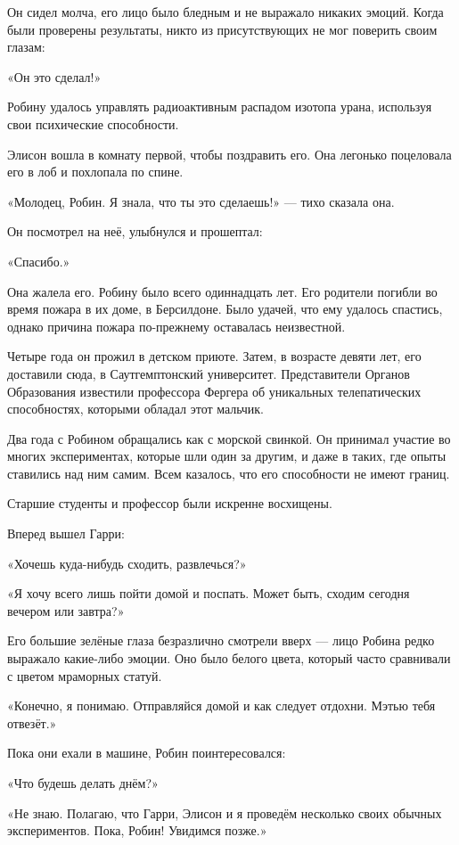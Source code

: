 \documentclass[a5paper, 9pt,
final, openany, twoside=true]{memoir}
\begin{document}
Он сидел молча, его лицо было бледным и не выражало никаких эмоций. Когда были проверены результаты, никто из присутствующих не мог поверить своим глазам:\bigskip

«Он это сделал!»\bigskip

Робину удалось управлять радиоактивным распадом изотопа урана, используя свои психические способности.

Элисон вошла в комнату первой, чтобы поздравить его. Она легонько поцеловала его в лоб и похлопала по спине.

«Молодец, Робин. Я знала, что ты это сделаешь!» — тихо сказала она.\bigskip

Он посмотрел на неё, улыбнулся и прошептал:

«Спасибо.»

Она жалела его. Робину было всего одиннадцать лет. Его родители погибли во время пожара в их доме, в Берсилдоне. Было удачей, что ему удалось спастись, однако причина пожара по-прежнему оставалась неизвестной.

Четыре года он прожил в детском приюте. Затем, в возрасте девяти лет, его доставили сюда, в Саутгемптонский университет. Представители Органов Образования известили профессора Фергера об уникальных телепатических способностях, которыми обладал этот мальчик.

Два года с Робином обращались как с морской свинкой. Он принимал участие во многих экспериментах, которые шли один за другим, и даже в таких, где опыты ставились над ним самим. Всем казалось, что его способности не имеют границ.\bigskip

Старшие студенты и профессор были искренне восхищены.

Вперед вышел Гарри:

«Хочешь куда-нибудь сходить, развлечься?»

«Я хочу всего лишь пойти домой и поспать. Может быть, сходим сегодня вечером или завтра?»

Его большие зелёные глаза безразлично смотрели вверх — лицо Робина редко выражало какие-либо эмоции. Оно было белого цвета, который часто сравнивали с цветом мраморных статуй.

«Конечно, я понимаю. Отправляйся домой и как следует отдохни. Мэтью тебя отвезёт.»\bigskip

Пока они ехали в машине, Робин поинтересовался:

«Что будешь делать днём?»

«Не знаю. Полагаю, что Гарри, Элисон и я проведём несколько своих обычных экспериментов. Пока, Робин! Увидимся позже.»
\end{document}
